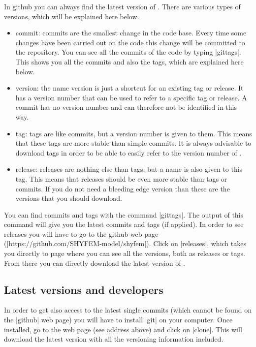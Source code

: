 In github you can always find the latest version of \shyfem{}. There
are various types of versions, which will be explained here below.

\begin{itemize}

\item commit: commits are the smallest change in the code base. Every time
some changes have been carried out on the code this change will be
committed to the repository. You can see all the commits of the code
by typing |gittags|. This shows you all the commits and also the tags,
which are explained here below.

\item version: the name version is just a shortcut for an existing tag
or release. It has a version number that can be used to refer to a
specific tag or release. A commit has no version number and can therefore not
be identified in this way.

\item tag: tags are like commits, but a version number is given to
them. This means that these tags are more stable than simple commits. It
is always advisable to download tags in order to be able to easily refer
to the version number of \shyfem{}.

\item release: releases are nothing else than tags, but a name is also
given to this tag. This means that releases should be even more stable
than tags or commits. If you do not need a bleeding edge version than
these are the versions that you should download.

\end{itemize}

You can find commits and tags with the command |gittags|. The output of
this command will give you the latest commits and tags (if applied). In
order to see releases you will have to go to the github web page
(|https://github.com/SHYFEM-model/shyfem|). Click on |releases|, which
takes you directly to page where you can see all the versions, both
as releases or tags. From there you can directly download the latest
version of \shyfem{}.

\subsection{Latest versions and developers}

In order to get also access to the latest single commits (which cannot
be found on the |github| web page) you will have to install |git| on
your computer. Once installed, go to the web page (see address above)
and click on |clone|. This will download the latest version with all
the versioning information included.

